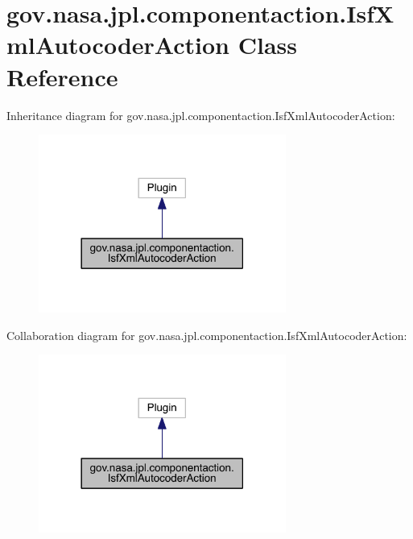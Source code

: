 \section{gov.\+nasa.\+jpl.\+componentaction.\+Isf\+Xml\+Autocoder\+Action Class Reference}
\label{classgov_1_1nasa_1_1jpl_1_1componentaction_1_1_isf_xml_autocoder_action}


Inheritance diagram for gov.\+nasa.\+jpl.\+componentaction.\+Isf\+Xml\+Autocoder\+Action\+:
\nopagebreak
\begin{figure}[H]
\begin{center}
\leavevmode
\includegraphics[width=230pt]{classgov_1_1nasa_1_1jpl_1_1componentaction_1_1_isf_xml_autocoder_action__inherit__graph}
\end{center}
\end{figure}


Collaboration diagram for gov.\+nasa.\+jpl.\+componentaction.\+Isf\+Xml\+Autocoder\+Action\+:
\nopagebreak
\begin{figure}[H]
\begin{center}
\leavevmode
\includegraphics[width=230pt]{classgov_1_1nasa_1_1jpl_1_1componentaction_1_1_isf_xml_autocoder_action__coll__graph}
\end{center}
\end{figure}
